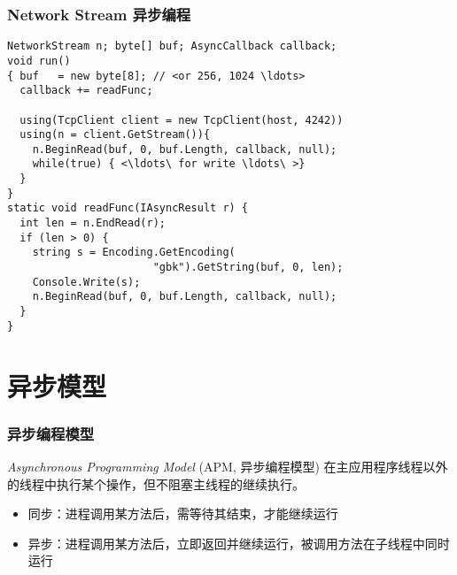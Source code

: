 
\begin{frame}[fragile]
\frametitle{Network Stream 异步编程}
\lstset{basicstyle=\scriptsize\ttfamily}
\begin{lstlisting}[escapeinside=<>]
NetworkStream n; byte[] buf; AsyncCallback callback;
void run()
{ buf   = new byte[8]; // <or 256, 1024 \ldots>
  callback += readFunc; 

  using(TcpClient client = new TcpClient(host, 4242))
  using(n = client.GetStream()){
    n.BeginRead(buf, 0, buf.Length, callback, null);
    while(true) { <\ldots\ for write \ldots\ >}
  }
}
static void readFunc(IAsyncResult r) {
  int len = n.EndRead(r);
  if (len > 0) {
    string s = Encoding.GetEncoding(
                       "gbk").GetString(buf, 0, len);
    Console.Write(s);
    n.BeginRead(buf, 0, buf.Length, callback, null);
  }
}
\end{lstlisting}
\end{frame}

\section{异步模型}

\begin{frame}
\frametitle{异步编程模型}
\begin{block}{\textit{Asynchronous Programming Model} (APM, 异步编程模型)}
\CJKindent  在主应用程序线程以外的线程中执行某个操作，但不阻塞主线程的继续执行。
\end{block}

\begin{itemize}
\item 同步：进程调用某方法后，需等待其结束，才能继续运行
\item 异步：进程调用某方法后，立即返回并继续运行，被调用方法在子线程中同时运行
\end{itemize}


\end{frame}


